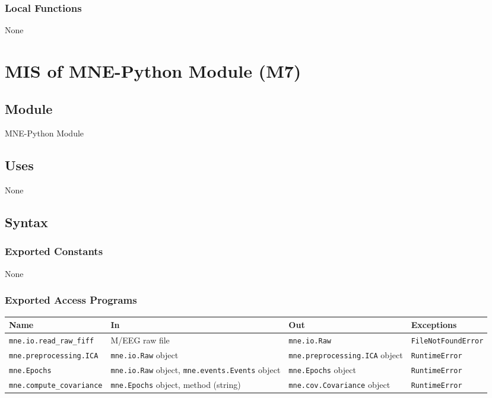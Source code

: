 \documentclass[12pt, titlepage]{article}
\begin{document}
\subsubsection{Local Functions}


None


\newpage








\section{MIS of MNE-Python Module (M7)}




\subsection{Module}


MNE-Python Module




\subsection{Uses}


None




\subsection{Syntax}


\subsubsection{Exported Constants}


None




\subsubsection{Exported Access Programs}


\begin{center}
\begin{tabular}{p{5cm} p{4cm} p{4cm} p{3cm}}
\hline
    \textbf{Name} & \textbf{In} & \textbf{Out} & \textbf{Exceptions} \\
\hline
    \lstinline|mne.io.read_raw_fiff| & M/EEG raw file & \lstinline|mne.io.Raw| & \lstinline|FileNotFoundError| \\
    \lstinline|mne.preprocessing.ICA| & \lstinline|mne.io.Raw| object & \lstinline|mne.preprocessing.ICA| object & \lstinline|RuntimeError| \\
    \lstinline|mne.Epochs| & \lstinline|mne.io.Raw| object, \lstinline|mne.events.Events| object & \lstinline|mne.Epochs| object & \lstinline|RuntimeError| \\
    \lstinline|mne.compute_covariance| & \lstinline|mne.Epochs| object, method (string) & \lstinline|mne.cov.Covariance| object & \lstinline|RuntimeError| \\
\hline
\end{tabular}
\end{center}
\end{document}
